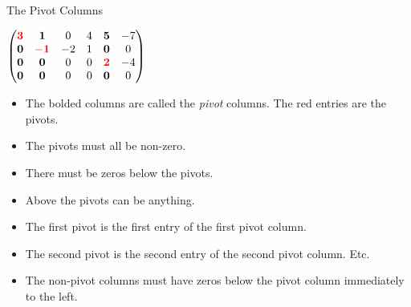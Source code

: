 \documentclass{beamer}
\begin{document}

\begin{frame}{The Pivot Columns}

$
\begin{pmatrix}
\textcolor{red}{\mathbf{3}} & \mathbf{1}                   &  0  & 4 & \mathbf{5}                  & -7 \\
\mathbf{0}                  & \textcolor{red}{\mathbf{-1}} & -2  & 1 & \mathbf{0}                  & 0  \\
\mathbf{0}                  & \mathbf{0}                   &  0  & 0 & \textcolor{red}{\mathbf{2}} & -4 \\
\mathbf{0}                  & \mathbf{0}                   &  0  & 0 & \mathbf{0}                  & 0  \\
\end{pmatrix}
$
\begin{itemize}
\item The bolded columns are called the \emph{pivot} columns. The red entries are the pivots.
\item The pivots must all be non-zero.
\item There must be zeros below the pivots.
\item Above the pivots can be anything.
\item The first pivot is the first entry of the first pivot column.
\item The second pivot is the second entry of the second pivot column. Etc.
\item The non-pivot columns must have zeros below the pivot column immediately to the left.
\end{itemize}

\end{frame}

\end{document}
